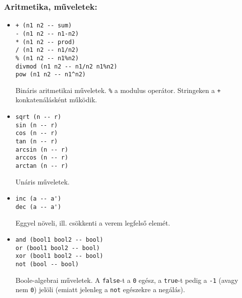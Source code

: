 \documentclass[a4paper]{article}
\begin{document}
\subsubsection*{Aritmetika, műveletek:}
\begin{itemize}
\item \begin{verbatim}+ (n1 n2 -- sum)
- (n1 n2 -- n1-n2)
* (n1 n2 -- prod)
/ (n1 n2 -- n1/n2)
% (n1 n2 -- n1%n2)
divmod (n1 n2 -- n1/n2 n1%n2)
pow (n1 n2 -- n1^n2)\end{verbatim} Bináris aritmetikai műveletek. \verb|%| a modulus operátor.
Stringeken a \verb|+| konkatenálásként működik.

\item \begin{verbatim}sqrt (n -- r)
sin (n -- r)
cos (n -- r)
tan (n -- r)
arcsin (n -- r)
arccos (n -- r)
arctan (n -- r)\end{verbatim} Unáris műveletek.

\item \begin{verbatim}inc (a -- a')
dec (a -- a')\end{verbatim} Eggyel növeli, ill. csökkenti a verem legfelső elemét.

\item \begin{verbatim}and (bool1 bool2 -- bool)
or (bool1 bool2 -- bool)
xor (bool1 bool2 -- bool)
not (bool -- bool)
\end{verbatim} Boole-algebrai műveletek. A \verb|false|-t a \verb|0| egész, a \verb|true|-t pedig a \verb|-1| (avagy nem \verb|0|) jelöli (emiatt jelenleg a \verb|not| egészekre a negálás).
\end{itemize}
\end{document}
